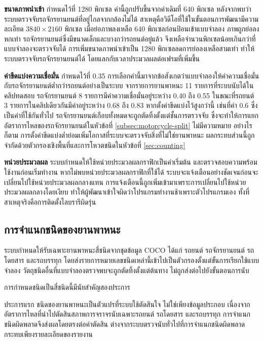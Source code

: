 \textbf{ขนาดภาพนำเข้า} กำหนดไว้ที่ 1280 พิกเซล ค่านี้ถูกปรับขึ้นจากค่าเดิมที่ 640 พิกเซล หลังจากพบว่าระบบตรวจจับรถจักรยานยนต์ที่อยู่ไกลจากกล้องไม่ได้  สาเหตุคือวิดีโอที่ใช้ในขั้นตอนการพัฒนามีความละเอียด $3840\times2160$ พิกเซล เมื่อย่อภาพลงเหลือ 640 พิกเซลก่อนป้อนเข้าแบบจำลอง ภาพถูกย่อลงหกเท่า รถจักรยานยนต์ซึ่งมีขนาดเล็กและบางกว่ารถยนต์อยู่แล้ว จึงเหลือจำนวนพิกเซลน้อยเกินกว่าที่แบบจำลองจะตรวจจับได้  การเพิ่มขนาดภาพนำเข้าเป็น 1280 พิกเซลลดการย่อลงเหลือสามเท่า ทำให้ระบบตรวจจับรถจักรยานยนต์ได้ โดยแลกกับเวลาประมวลผลต่อเฟรมที่เพิ่มขึ้น

\textbf{ค่าขีดแบ่งความเชื่อมั่น} กำหนดไว้ที่ 0.35 การเลือกค่านี้มาจากข้อสังเกตว่าแบบจำลองให้ค่าความเชื่อมั่นกับรถจักรยานยนต์ต่ำกว่ารถยนต์อย่างเป็นระบบ  จากรายการยานพาหนะ 11 รายการที่ระบบนับได้ในคลิปทดสอบ รถจักรยานยนต์ 8 รายการมีค่าความเชื่อมั่นอยู่ระหว่าง 0.40 ถึง 0.55 ในขณะที่รถยนต์ 3 รายการในคลิปเดียวกันมีค่าอยู่ระหว่าง 0.68 ถึง 0.83  หากตั้งค่าขีดแบ่งไว้สูงกว่านี้ เช่นที่ค่า 0.6 ซึ่งเป็นค่าที่ใช้กันทั่วไป รถจักรยานยนต์เกือบทั้งหมดจะถูกตัดทิ้งตั้งแต่ชั้นการตรวจจับ ซึ่งจะทำให้การแยกอัตราการไหลของรถจักรยานยนต์ในหัวข้อที่ \ref{subsec:motorcycle-split} ไม่มีความหมาย  อย่างไรก็ตาม การตั้งค่าขีดแบ่งต่ำย่อมเพิ่มโอกาสที่ระบบจะตรวจจับสิ่งที่ไม่ใช่ยานพาหนะ ผลกระทบส่วนนี้ถูกจำกัดด้วยตัวกรองเชิงพื้นที่และการโหวตชนิดในหัวข้อที่ \ref{sec:counting}

\textbf{หน่วยประมวลผล} ระบบกำหนดให้ใช้หน่วยประมวลผลกราฟิกเป็นค่าเริ่มต้น และตรวจสอบความพร้อมใช้งานก่อนเริ่มทำงาน หากไม่พบหน่วยประมวลผลกราฟิกที่ใช้ได้ ระบบจะแจ้งเตือนอย่างชัดเจนก่อนจะเปลี่ยนไปใช้หน่วยประมวลผลกลางแทน  การแจ้งเตือนนี้ถูกเพิ่มเข้ามาเพราะการเปลี่ยนไปใช้หน่วยประมวลผลกลางโดยเงียบ ทำให้ผู้พัฒนาเข้าใจผิดว่าโปรแกรมทำงานช้าเพราะตัวโปรแกรมเอง ทั้งที่สาเหตุจริงคือการติดตั้งไลบรารีผิดรุ่น

\subsection{การจำแนกชนิดของยานพาหนะ}
\label{subsec:vehicle-classes}

ระบบกำหนดให้รับเฉพาะยานพาหนะสี่ชนิดจากชุดข้อมูล COCO ได้แก่ รถยนต์ รถจักรยานยนต์ รถโดยสาร และรถบรรทุก โดยส่งรายการหมายเลขชนิดเหล่านี้เข้าไปเป็นตัวกรองตั้งแต่ขั้นการเรียกใช้แบบจำลอง วัตถุชนิดอื่นที่แบบจำลองตรวจพบจะถูกตัดทิ้งตั้งแต่ต้นทาง ไม่ถูกส่งต่อไปยังขั้นตอนการนับ

การกำหนดชนิดเป็นสี่ชนิดนี้มีนัยสำคัญสองประการ

ประการแรก ชนิดของยานพาหนะเป็นตัวแปรที่ระบบใช้ตัดสินใจ ไม่ใช่เพียงข้อมูลประกอบ เนื่องจากอัตราการไหลที่นำไปตัดสินสภาพการจราจรนับเฉพาะรถยนต์ รถโดยสาร และรถบรรทุก การจำแนกชนิดผิดพลาดจึงส่งผลโดยตรงต่อคำตัดสิน ต่างจากระบบตรวจนับทั่วไปที่การจำแนกชนิดผิดพลาดกระทบเพียงรายละเอียดของรายงาน

